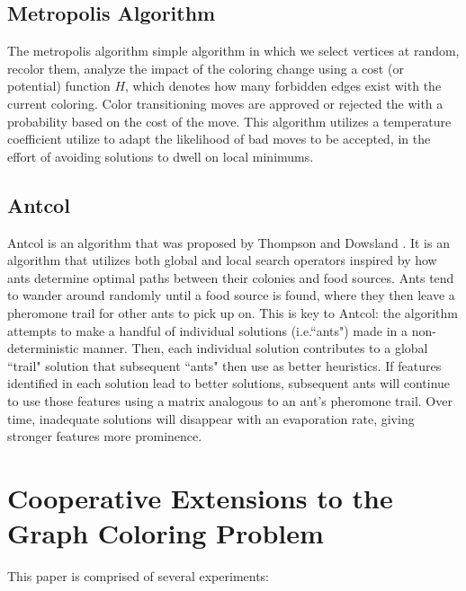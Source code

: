 \documentclass[runningheads]{llncs}
\begin{document}
\subsection{Metropolis Algorithm}
The metropolis algorithm simple algorithm in which we select vertices at random, recolor them, analyze the impact of the coloring change using a cost (or potential) function $H$, which denotes how many forbidden edges exist with the current coloring. Color transitioning moves are approved or rejected the with a probability based on the cost of the move. This algorithm utilizes a temperature coefficient utilize to adapt the likelihood of bad moves to be accepted, in the effort of avoiding solutions to dwell on local minimums.

\subsection{Antcol}

Antcol is an algorithm that was proposed by Thompson and Dowsland \cite{ant_kj}. It is an algorithm that utilizes both global and local search operators inspired by how ants determine optimal paths between their colonies and food sources. Ants tend to wander around randomly until a food source is found, where they then leave a pheromone trail for other ants to pick up on. This is key to Antcol: the algorithm attempts to make a handful of individual solutions (i.e.``ants") made in a non-deterministic manner. Then, each individual solution contributes to a global ``trail" solution that subsequent ``ants" then use as better heuristics. If features identified in each solution lead to better solutions, subsequent ants will continue to use those features using a matrix analogous to an ant's pheromone trail. Over time, inadequate solutions will disappear with an evaporation rate, giving stronger features more prominence.

\section{Cooperative Extensions to the Graph Coloring Problem}

This paper is comprised of several experiments:
\end{document}
